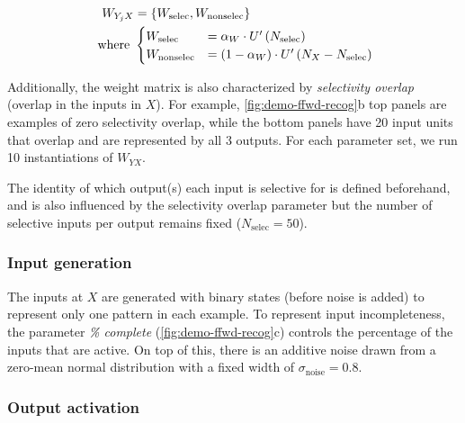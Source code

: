 \vspace{1em}
\begin{equation}
    \label{eq:ffwdweight-alphaW}
    \begin{aligned}
        W_{Y_j X} &= \left\{
                W_{\mathrm{selec}},
                W_{\mathrm{nonselec}}
                \right\} \\
            \text{ where } &
            \begin{cases}
                W_{\mathrm{selec}} &=
                    \alpha_W
                    \cdot
                    U^{\prime}\left(N_{\text{selec}}\right) \\
                W_{\mathrm{nonselec}} &=
                    (1 - \alpha_W)
                    \cdot
                    U^{\prime}\left(N_X - N_{\text{selec}}\right)
            \end{cases}
    \end{aligned}
\end{equation}


Additionally, the weight matrix is also characterized by \textit{selectivity overlap}
    (overlap in the inputs in $X$).
    For example, \autoref{fig:demo-ffwd-recog}b top panels are examples of zero selectivity overlap,
        while the bottom panels have 20 input units that overlap and are represented by all 3 outputs.
    For each parameter set, we run 10 instantiations of $W_{YX}$.

The identity of which output(s) each input is selective for is defined beforehand,
    and is also influenced by the selectivity overlap parameter
    but the number of selective inputs per output remains fixed ($N_{\text{selec}}=50$).

\subsubsection*{Input generation}

The inputs at $X$ are generated with binary states (before noise is added)
        to represent only one pattern in each example.
    To represent input incompleteness, the parameter \textit{\% complete}
        (\autoref{fig:demo-ffwd-recog}c)
        controls the percentage of the inputs that are active.
    On top of this, there is an additive noise
        drawn from a zero-mean normal distribution
        with a fixed width of $\sigma_{\text{noise}} = 0.8$.

\subsubsection*{Output activation}

